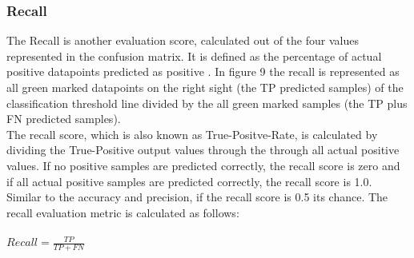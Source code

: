 \documentclass[../masterarbeit.tex]{subfiles}
\begin{document}
\subsubsection{Recall}
The Recall is another evaluation score, calculated out of the four values represented in the confusion matrix. It is defined as the percentage of actual positive datapoints predicted as positive \textcite[]{Google_Precision_Recall:2022}. In figure 9 the recall is represented as all green marked datapoints on the right sight (the TP predicted samples) of the classification threshold line divided by the all green marked samples (the TP plus FN predicted samples). \\
The recall score, which is also known as True-Positve-Rate, is calculated by dividing the True-Positive output values through the through all actual positive values. If no positive samples are predicted correctly, the recall score is zero and if all actual positive samples are predicted correctly, the recall score is 1.0. Similar to the accuracy and precision, if the recall score is 0.5 its chance.
The recall evaluation metric is calculated as follows:
\\~\\
\(Recall = \frac{TP}{TP + FN} \) \hfill \textcite[]{Kartik_evaluation:2022} \\~\\
\end{document}
